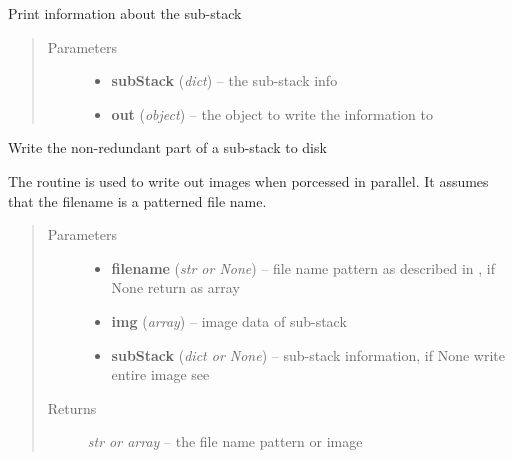 \documentclass[letterpaper,10pt,english]{sphinxmanual}
\begin{document}
\begin{fulllineitems}
\label{api/ClearMap.ImageProcessing:ClearMap.ImageProcessing.StackProcessing.printSubStackInfo}
Print information about the sub-stack
\begin{quote}\begin{description}
\item[{Parameters}] \leavevmode\begin{itemize}
\item {} 
\textbf{subStack} (\emph{dict}) --
the sub-stack info

\item {} 
\textbf{out} (\emph{object}) --
the object to write the information to

\end{itemize}

\end{description}\end{quote}

\end{fulllineitems}


\begin{fulllineitems}
\label{api/ClearMap.ImageProcessing:ClearMap.ImageProcessing.StackProcessing.writeSubStack}
Write the non-redundant part of a sub-stack to disk

The routine is used to write out images when porcessed in parallel.
It assumes that the filename is a patterned file name.
\begin{quote}\begin{description}
\item[{Parameters}] \leavevmode\begin{itemize}
\item {} 
\textbf{filename} (\emph{str or None}) --
file name pattern as described in
, if None return as array

\item {} 
\textbf{img} (\emph{array}) --
image data of sub-stack

\item {} 
\textbf{subStack} (\emph{dict or None}) --
sub-stack information, if None write entire image
see 

\end{itemize}

\item[{Returns}] \leavevmode
\emph{str or array} --
the file name pattern or image

\end{description}\end{quote}

\end{fulllineitems}
\end{document}
